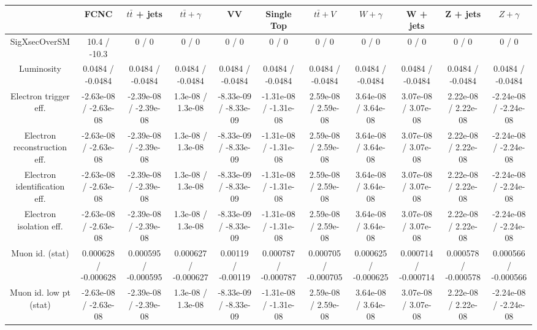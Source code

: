 {\begin{landscape}
\begin{longtable}{@{\extracolsep{\fill}}| *{11}{c|}}
\hline 
      & FCNC      & $t\bar{t}$ + jets      & $t\bar{t} +  \gamma $     & VV      & Single Top      & $t\bar{t} + V$      & $W+\gamma$     & W + jets      & Z + jets      & $Z+\gamma$ \\ 
\hline 
 SigXsecOverSM & 10.4 / -10.3 & 0 / 0 & 0 / 0 & 0 / 0 & 0 / 0 & 0 / 0 & 0 / 0 & 0 / 0 & 0 / 0 & 0 / 0 \\ 
  Luminosity & 0.0484 / -0.0484 & 0.0484 / -0.0484 & 0.0484 / -0.0484 & 0.0484 / -0.0484 & 0.0484 / -0.0484 & 0.0484 / -0.0484 & 0.0484 / -0.0484 & 0.0484 / -0.0484 & 0.0484 / -0.0484 & 0.0484 / -0.0484 \\ 
  Electron trigger eff. & -2.63e-08 / -2.63e-08 & -2.39e-08 / -2.39e-08 & 1.3e-08 / 1.3e-08 & -8.33e-09 / -8.33e-09 & -1.31e-08 / -1.31e-08 & 2.59e-08 / 2.59e-08 & 3.64e-08 / 3.64e-08 & 3.07e-08 / 3.07e-08 & 2.22e-08 / 2.22e-08 & -2.24e-08 / -2.24e-08 \\ 
  Electron reconstruction eff. & -2.63e-08 / -2.63e-08 & -2.39e-08 / -2.39e-08 & 1.3e-08 / 1.3e-08 & -8.33e-09 / -8.33e-09 & -1.31e-08 / -1.31e-08 & 2.59e-08 / 2.59e-08 & 3.64e-08 / 3.64e-08 & 3.07e-08 / 3.07e-08 & 2.22e-08 / 2.22e-08 & -2.24e-08 / -2.24e-08 \\ 
  Electron identification eff. & -2.63e-08 / -2.63e-08 & -2.39e-08 / -2.39e-08 & 1.3e-08 / 1.3e-08 & -8.33e-09 / -8.33e-09 & -1.31e-08 / -1.31e-08 & 2.59e-08 / 2.59e-08 & 3.64e-08 / 3.64e-08 & 3.07e-08 / 3.07e-08 & 2.22e-08 / 2.22e-08 & -2.24e-08 / -2.24e-08 \\ 
  Electron isolation eff. & -2.63e-08 / -2.63e-08 & -2.39e-08 / -2.39e-08 & 1.3e-08 / 1.3e-08 & -8.33e-09 / -8.33e-09 & -1.31e-08 / -1.31e-08 & 2.59e-08 / 2.59e-08 & 3.64e-08 / 3.64e-08 & 3.07e-08 / 3.07e-08 & 2.22e-08 / 2.22e-08 & -2.24e-08 / -2.24e-08 \\ 
  Muon id. (stat) & 0.000628 / -0.000628 & 0.000595 / -0.000595 & 0.000627 / -0.000627 & 0.00119 / -0.00119 & 0.000787 / -0.000787 & 0.000705 / -0.000705 & 0.000625 / -0.000625 & 0.000714 / -0.000714 & 0.000578 / -0.000578 & 0.000566 / -0.000566 \\ 
  Muon id. low pt (stat) & -2.63e-08 / -2.63e-08 & -2.39e-08 / -2.39e-08 & 1.3e-08 / 1.3e-08 & -8.33e-09 / -8.33e-09 & -1.31e-08 / -1.31e-08 & 2.59e-08 / 2.59e-08 & 3.64e-08 / 3.64e-08 & 3.07e-08 / 3.07e-08 & 2.22e-08 / 2.22e-08 & -2.24e-08 / -2.24e-08 \\ 

\end{longtable}
\end{landscape}}
